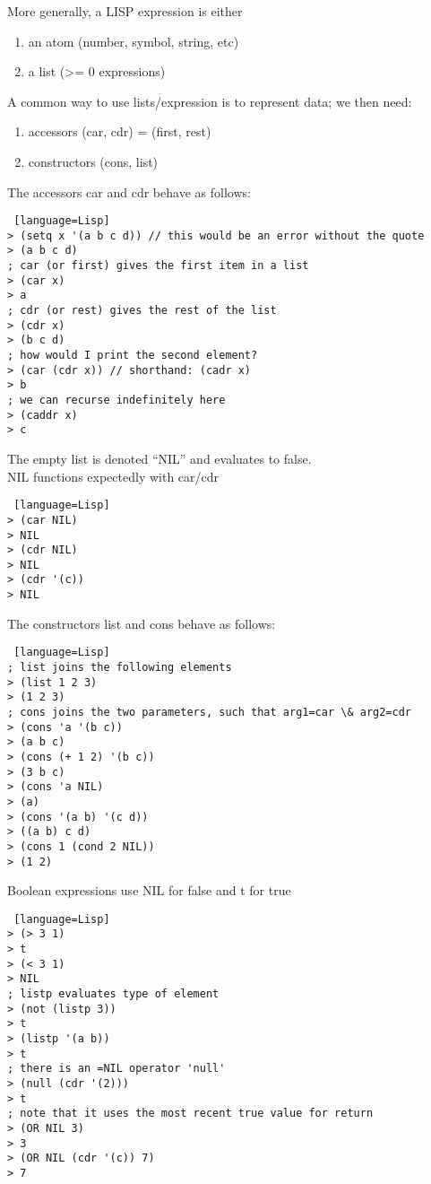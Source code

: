 \documentclass[../../lecture_notes.tex]{subfiles}
\begin{document}
\noindent More generally, a LISP expression is either
\begin{enumerate}
\item an atom (number, symbol, string, etc)
\item a list (>= 0 expressions)
\end{enumerate} \medskip

\noindent A common way to use lists/expression is to represent data; we then need:
\begin{enumerate}
\item accessors (car, cdr) = (first, rest)
\item constructors (cons, list)
\end{enumerate}
\noindent The accessors car and cdr behave as follows:
\begin{lstlisting} [language=Lisp]
> (setq x '(a b c d)) // this would be an error without the quote
> (a b c d)
; car (or first) gives the first item in a list
> (car x)
> a
; cdr (or rest) gives the rest of the list
> (cdr x)
> (b c d)
; how would I print the second element?
> (car (cdr x)) // shorthand: (cadr x)
> b
; we can recurse indefinitely here
> (caddr x)
> c
\end{lstlisting}
The empty list is denoted “NIL” and evaluates to false.\\
NIL functions expectedly with car/cdr
\begin{lstlisting} [language=Lisp]
> (car NIL)
> NIL
> (cdr NIL)
> NIL
> (cdr '(c))
> NIL
\end{lstlisting}

\noindent The constructors list and cons behave as follows:\\
\begin{lstlisting} [language=Lisp]
; list joins the following elements
> (list 1 2 3)
> (1 2 3)
; cons joins the two parameters, such that arg1=car \& arg2=cdr
> (cons 'a '(b c))
> (a b c)
> (cons (+ 1 2) '(b c))
> (3 b c)
> (cons 'a NIL)
> (a)
> (cons '(a b) '(c d))
> ((a b) c d)
> (cons 1 (cond 2 NIL))
> (1 2)
\end{lstlisting} \medskip

\noindent Boolean expressions use NIL for false and t for true
\begin{lstlisting} [language=Lisp]
> (> 3 1)
> t
> (< 3 1)
> NIL
; listp evaluates type of element
> (not (listp 3))
> t
> (listp '(a b))
> t
; there is an =NIL operator 'null'
> (null (cdr '(2)))
> t
; note that it uses the most recent true value for return
> (OR NIL 3)
> 3
> (OR NIL (cdr '(c)) 7)
> 7
\end{lstlisting} \medskip
\end{document}
